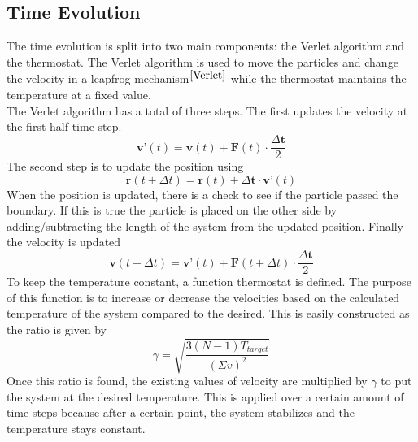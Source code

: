 \documentclass[letterpaper,12pt]{article}
\numberwithin{equation}{subsection}
\begin{document}
\subsection{Time Evolution}
The time evolution is split into two main components: the Verlet algorithm and the thermostat. The Verlet algorithm is used to move the particles and change the velocity in a leapfrog mechanism$^{\cite{Verlet}}$ while the thermostat maintains the temperature at a fixed value. \\
\indent The Verlet algorithm has a total of three steps. The first updates the velocity at the first half time step.
\begin{equation}
\textbf{v'}(t) = \textbf{v}(t) + \textbf{F}(t) \cdot \frac{\Delta \textbf{t}}{2}
\end{equation}
The second step is to update the position using
\begin{equation}
\textbf{r}(t + \Delta t) = \textbf{r}(t) + \Delta \textbf{t} \cdot \textbf{v'}(t)
\end{equation}
When the position is updated, there is a check to see if the particle passed the boundary. If this is true the particle is placed on the other side by adding/subtracting the length of the system from the updated position. Finally the velocity is updated
\begin{equation}
\textbf{v}(t + \Delta t) = \textbf{v'}(t) + \textbf{F}(t + \Delta t) \cdot \frac{\Delta \textbf{t}}{2}
\end{equation}
\indent To keep the temperature constant, a function thermostat is defined. The purpose of this function is to increase or decrease the velocities based on the calculated temperature of the system compared to the desired. This is easily constructed as the ratio is given by
\begin{equation} \label{eq:ratio}
\gamma = \sqrt{\frac{3(N-1) T_{target}}{(\Sigma v)^{2}}}
\end{equation}
Once this ratio is found, the existing values of velocity are multiplied by $\gamma$ to put the system at the desired temperature. This is applied over a certain amount of time steps because after a certain point, the system stabilizes and the temperature stays constant.
\end{document}
